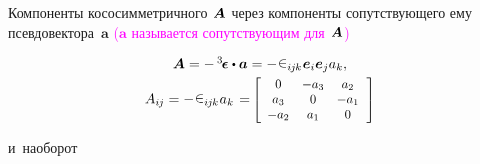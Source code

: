 \begin{otherlanguage}{russian}
Компоненты кососимметричного~${\hspace{-0.2ex}\bm{A}}$ через компоненты сопутствующего ему псевдовектора~$\bm{a}$
\textcolor{magenta}{($\bm{a}$ называется сопутствующим для~${\hspace{-0.2ex}\bm{A}}$)}

\nopagebreak\vspace{-0.1em}\begin{equation*}
\begin{array}{c}
\bm{A} = - \, \levicivitatensor \dotp \bm{a} = - \hspace{.1ex} \levicivita_{i\hspace{-0.1ex}j\hspace{-0.1ex}k} \hspace{.1ex} \bm{e}_i \bm{e}_j a_k ,
\\[.3em]
A_{i\hspace{-0.1ex}j} = - \hspace{.1ex} \levicivita_{i\hspace{-0.1ex}j\hspace{-0.1ex}k} \hspace{.1ex} a_k \hspace{.1em} = \hspace{-0.1em}
\scalebox{0.9}[0.9]{$\left[ \begin{array}{ccc}
0 & -a_3 & a_2 \\
a_3 & 0 & -a_1 \\
-a_2 & a_1 & 0
\end{array} \hspace{.25ex}\right]$}
\end{array}
\end{equation*}

\vspace{-0.4em} \noindent и~наоборот


\end{otherlanguage}
